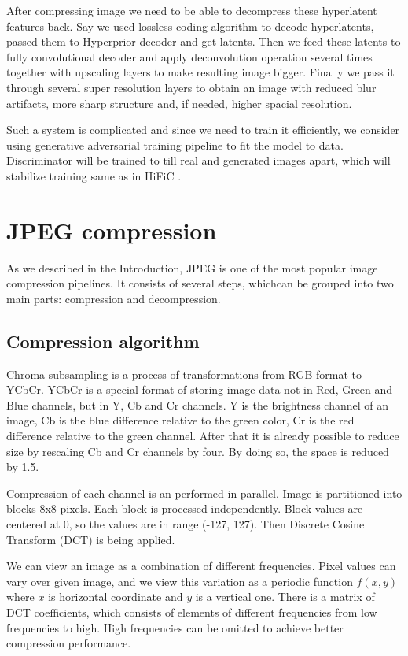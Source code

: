 After compressing image we need to be able to decompress these hyperlatent features back. Say we used lossless coding algorithm to decode hyperlatents, passed them to Hyperprior decoder and get latents. Then we feed these latents to fully convolutional decoder and apply deconvolution operation several times together with upscaling layers to make resulting image bigger. Finally we pass it through several super resolution layers to obtain an image with reduced blur artifacts, more sharp structure and, if needed, higher spacial resolution.

Such a system is complicated and since we need to train it efficiently, we consider using generative adversarial training pipeline to fit the model to data. Discriminator will be trained to till real and generated images apart, which will stabilize training same as in HiFiC \cite{mentzer_high_fidelity_2020}.

\section{JPEG compression}

As we described in the Introduction, JPEG is one of the most popular image compression pipelines. It consists of several steps, whichcan be grouped into two main parts: compression and decompression.

\subsection{Compression algorithm}

\label{section:traditional-compression}

Chroma subsampling is a process of transformations from RGB format to YCbCr. YCbCr is a special format of storing image data not in Red, Green and Blue channels, but in Y, Cb and Cr channels. Y is the brightness channel of an image, Cb is the blue difference relative to the green color, Cr is the red difference relative to the green channel. After that it is already possible to reduce size by rescaling Cb and Cr channels by four. By doing so, the space is reduced by 1.5.

Compression of each channel is an performed in parallel. Image is partitioned into blocks 8x8 pixels. Each block is processed independently. Block values are centered at 0, so the values are in range (-127, 127). Then Discrete Cosine Transform (DCT) is being applied.

We can view an image as a combination of different frequencies. Pixel values can vary over given image, and we view this variation as a periodic function $f(x, y)$ where $x$ is horizontal coordinate and $y$ is a vertical one. There is a matrix of DCT coefficients, which consists of elements of different frequencies from low frequencies to high. High frequencies can be omitted to achieve better compression performance.

